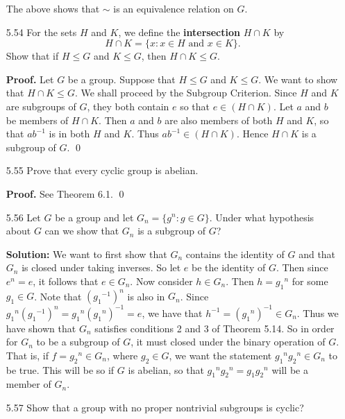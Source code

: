 \begin{enumerate}
      The above shows that $\sim$ is an equivalence relation on $G$.
   \item[5.54] For the sets $H$ and $K$, we define the \textbf{intersection}
               $H \cap K$ by
               $$H \cap K = \{x : x \in H \text{ and } x \in K\}.$$
               Show that if $H \le G$ and $K \le G$, then $H \cap K \le G$.

      \textbf{Proof.} Let $G$ be a group. Suppose that $H \le G$ and $K \le G$.
      We want to show that $H \cap K \le G$. We shall proceed by the Subgroup
      Criterion. Since $H$ and $K$ are subgroups of $G$, they both contain $e$
      so that $e \in (H \cap K)$. Let $a$ and $b$ be members of $H \cap K$. Then
      $a$ and $b$ are also members of both $H$ and $K$, so that $ab^{-1}$ is
      in both $H$ and $K$. Thus $ab^{-1} \in (H \cap K)$. Hence $H \cap K$ is a
      subgroup of $G$. \qed
   \item[5.55] Prove that every cyclic group is abelian.

      \textbf{Proof.} See Theorem 6.1. \qed
   \item[5.56] Let $G$ be a group and let $G_n = \{g^n : g \in G\}$. Under what
               hypothesis about $G$ can we show that $G_n$ is a subgroup of $G$?

      \textbf{Solution:} We want to first show that $G_n$ contains the identity 
      of $G$ and that $G_n$ is closed under taking inverses. So let $e$ be the 
      identity of $G$. Then since $e^n = e$, it follows that $e \in G_n$. Now 
      consider $h \in G_n$. Then $h = {g_1}^n$ for some $g_1 \in G$. Note that
      $({g_1}^{-1})^n$ is also in $G_n$. Since
      ${g_1}^n({g_1}^{-1})^n = {g_1}^n({g_1}^n)^{-1} = e$, we have that
      $h^{-1} = ({g_1}^n)^{-1} \in G_n$. Thus we have shown that
      $G_n$ satisfies conditions 2 and 3 of Theorem 5.14. So in order for $G_n$ 
      to be a subgroup of $G$, it must closed under the binary operation of $G$.
      That is, if $f = {g_2}^n \in G_n$, where $g_2 \in G$, we want the
      statement ${g_1}^n{g_2}^n \in G_n$ to be true. This will be so if $G$
      is abelian, so that ${g_1}^n{g_2}^n = {g_1g_2}^n$ will be a member of
      $G_n$.
   \item[5.57] Show that a group with no proper nontrivial subgroups is
               cyclic?


\end{enumerate}

